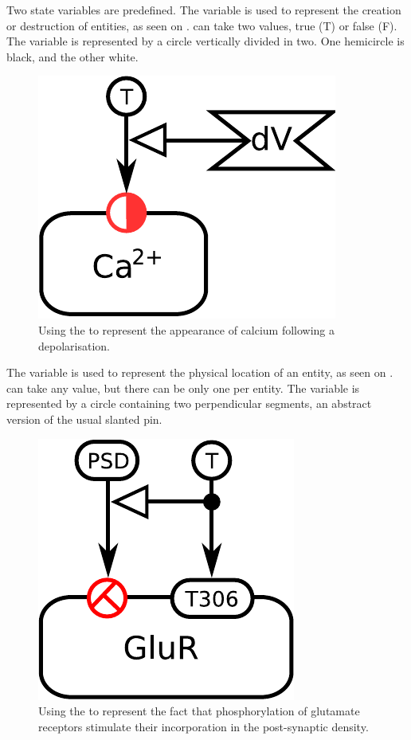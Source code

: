 Two state variables are predefined. The variable  is used to represent the creation or destruction of entities, as seen on \label{sec:existence}.  can take two values, true (T) or false (F). The variable is represented by a circle vertically divided in two. One hemicircle is black, and the other white. 

\begin{figure}[H]
  \centering
  \includegraphics[scale = 0.5]{examples/ex-existence}
  \caption{Using the   to represent the appearance of calcium following a depolarisation.}
  \label{fig:ex-existence}
\end{figure}

The variable  is used to represent the physical location of an entity, as seen on \label{sec:location}.  can take any value, but there can be only one  per entity. The variable is represented by a circle containing two perpendicular segments, an abstract version of the usual slanted pin.

\begin{figure}[H]
  \centering
  \includegraphics[scale = 0.5]{examples/ex-location-2}
  \caption{Using the   to represent the fact that phosphorylation of glutamate receptors stimulate their incorporation in the post-synaptic density.}
  \label{fig:ex-location}
\end{figure}

\normalcolor


